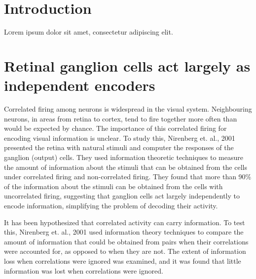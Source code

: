 \documentclass[twoside]{article}
\begin{document}
\begin{multicols}{2} %

\section{Introduction}

\lettrine[nindent=0em,lines=3]{L} orem ipsum dolor sit amet, consectetur adipiscing elit.
\lipsum[2-3] 





\section{Retinal ganglion cells act largely as independent encoders}

Correlated firing among neurons is widespread in the visual system. Neighbouring neurons, in areas from retina to cortex, tend to fire together more often than would be expected by chance. The importance of this correlated firing for encoding visual information is unclear. To study this, Nirenberg et. al., 2001 presented the retina with natural stimuli and computer the responses of the ganglion (output) cells. They used information theoretic techniques to measure the amount of information about the stimuli that can be obtained from the cells under correlated firing and non-correlated firing. They found that more than 90\% of the information about the stimuli can be obtained from the cells with uncorrelated firing, suggesting that ganglion cells act largely independently to encode information, simplifying the problem of decoding their activity. 

It has been hypothesized that correlated activity can carry information. To test this, Nirenberg et. al., 2001 used information theory techniques to compare the amount of information that could be obtained from pairs when their correlations were accounted for, as opposed to when they are not. The extent of information loss when correlations were ignored was examined, and it was found that little information was lost when correlations were ignored. 


\end{multicols}
\end{document}
